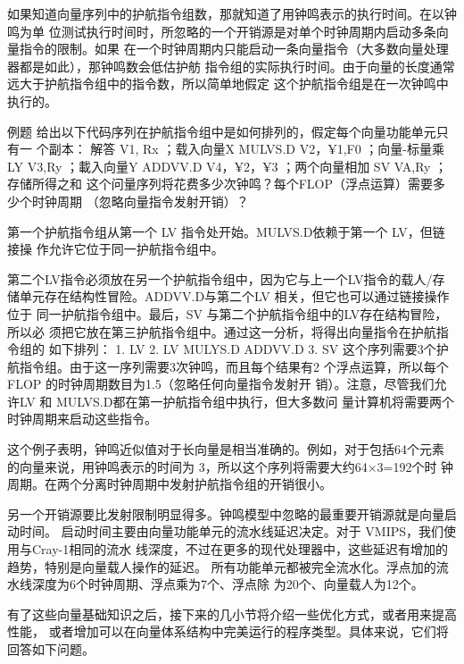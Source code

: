 如果知道向量序列中的护航指令组数，那就知道了用钟鸣表示的执行时间。在以钟鸣为单
位测试执行时间时，所忽略的一个开销源是对单个时钟周期内启动多条向量指令的限制。如果
在一个时钟周期内只能启动一条向量指令（大多数向量处理器都是如此），那钟鸣数会低估护舫
指令组的实际执行时间。由于向量的长度通常远大于护航指令组中的指令数，所以简单地假定
这个护航指令组是在一次钟鸣中执行的。

例题
给出以下代码序列在护航指令组中是如何排列的，假定每个向量功能单元只有一
个副本：
解答
V1, Rx
；载入向量X
MULVS.D
V2，¥1,F0
；向量-标量乘
LY
V3,Ry
；載入向量Y
ADDVV.D
V4，¥2，¥3
；两个向量相加
SV
VA,Ry
；存储所得之和
这个问量序列将花费多少次钟鸣？每个FLOP（浮点运算）需要多少个时钟周期
（忽略向量指令发射开销）？

第一个护航指令组从第一个 LV 指令处开始。MULVS.D依赖于第一个 LV，但链接操
作允许它位于同一护航指令组中。

第二个LV指令必须放在另一个护航指令组中，因为它与上一个LV指令的载人/存
储单元存在结构性冒险。ADDVV.D与第二个LV 相关，但它也可以通过链接操作位于
同一护航指令组中。最后，SV 与第二个护航指令组中的LV存在结构冒险，所以必
须把它放在第三护航指令组中。通过这一分析，将得出向量指令在护航指令组的
如下排列：
1. LV
2. LV
MULYS.D
ADDVV.D
3. SV
这个序列需要3个护航指令组。由于这一序列需要3次钟鸣，而且每个结果有2
个浮点运算，所以每个 FLOP 的时钟周期数目为1.5（忽略任何向量指令发射开
销）。注意，尽管我们允许LV 和 MULVS.D都在第一护航指令组中执行，但大多数问
量计算机将需要两个时钟周期来启动这些指令。

这个例子表明，钟鸣近似值对于长向量是相当准确的。例如，对于包括64个元素
的向量来说，用钟鸣表示的时间为 3，所以这个序列将需要大约64×3=192个时
钟周期。在两个分离时钟周期中发射护航指令组的开销很小。

另一个开销源要比发射限制明显得多。钟鸣模型中忽略的最重要开销源就是向量启动时间。
启动时间主要由向量功能单元的流水线延迟决定。对于 VMIPS，我们使用与Cray-1相同的流水
线深度，不过在更多的现代处理器中，这些延迟有增加的趋势，特别是向量载人操作的延迟。
所有功能单元都被完全流水化。浮点加的流水线深度为6个时钟周期、浮点乘为7个、浮点除
为20个、向量载人为12个。

有了这些向量基础知识之后，接下来的几小节将介绍一些优化方式，或者用来提高性能，
或者增加可以在向量体系结构中完美运行的程序类型。具体来说，它们将回答如下问题。

